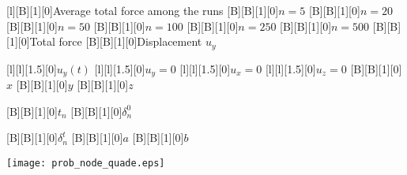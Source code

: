 \documentclass[border=12pt, crop]{standalone}
\begin{document}
  
  
      [l][B][1][0]{Average total force among the runs}
      [B][B][1][0]{$n = 5$}
      [B][B][1][0]{$n = 20$}
      [B][B][1][0]{$n = 50$}
      [B][B][1][0]{$n = 100$}
      [B][B][1][0]{$n = 250$}
      [B][B][1][0]{$n = 500$}
      [B][B][1][0]{Total force}
      [B][B][1][0]{Displacement $u_y$}
            
      [l][l][1.5][0]{$u_y(t)$}
      [l][l][1.5][0]{$u_y = 0$}
      [l][l][1.5][0]{$u_x = 0$}
      [l][l][1.5][0]{$u_z = 0$}
 [B][B][1][0]{$x$}
  [B][B][1][0]{$y$}  
  [B][B][1][0]{$z$}
  
    [B][B][1][0]{$t_n$}
        [B][B][1][0]{$\delta_n^0$}

    [B][B][1][0]{$\delta_n^t$}
    [B][B][1][0]{$a$}
    [B][B][1][0]{$b$}


      \texttt{[image: prob\_node\_quade.eps]}

    
\end{document}
